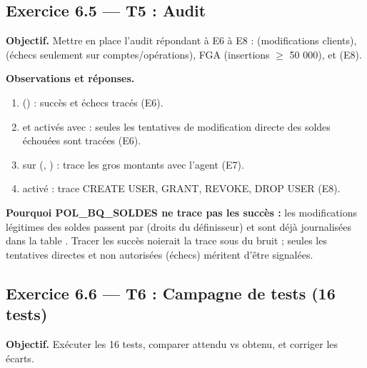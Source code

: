 \subsection{Exercice 6.5 — T5 : Audit}
\textbf{Objectif.} Mettre en place l'audit répondant à E6 à E8 :
 (modifications clients),  (échecs seulement
sur comptes/opérations), FGA  (insertions $\ge$ 50 000),
et  (E8).


\textbf{Observations et réponses.}
\begin{enumerate}
  \item {} () :
        succès et échecs tracés (E6).
  \item {} et  activés avec
         : seules les tentatives de modification directe
        des soldes échouées sont tracées (E6).
  \item {} sur  (,
        ) : trace les gros montants avec l'agent (E7).
  \item {} activé : trace CREATE USER, GRANT, REVOKE, DROP USER
        (E8).
\end{enumerate}
\textbf{Pourquoi POL\_BQ\_SOLDES ne trace pas les succès :} les modifications légitimes
des soldes passent par  (droits du définisseur) et sont déjà
journalisées dans la table . Tracer les succès noierait la trace sous du
bruit ; seules les tentatives directes et non autorisées (échecs) méritent d'être
signalées.

\subsection{Exercice 6.6 — T6 : Campagne de tests (16 tests)}
\textbf{Objectif.} Exécuter les 16 tests, comparer attendu vs obtenu, et corriger les écarts.


